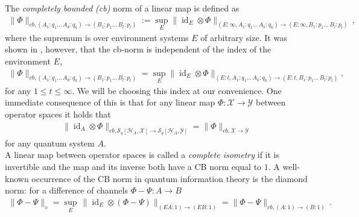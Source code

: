 \documentclass[11pt]{article}
\DeclareMathOperator{\id}{id}
\newcommand{\1}{\ensuremath{\mathbbm{1}}}
\theoremstyle{newdefinition}
\theoremstyle{newplain}
\theoremstyle{myplain}
\begin{document}
The \textit{completely bounded (cb)} norm of a linear map is defined as
\begin{align}
    \|\Phi\|_{cb,(A_1:q_1...\,A_k:q_k)\to (B_1:p_1...\,B_l:p_l)} := \sup_E\|\id_E\otimes\Phi\|_{(E:\infty,A_1:q_1...\,A_k:q_k)\to (E:\infty,B_1:p_1...\,B_l:p_l)}\,,
\end{align}
where the supremum is over environment systems $E$ of arbitrary size. It was shown in \cite[Lemma 1.7]{Book.Pisier.1998}, however, that the cb-norm is independent of the index of the environment $E$, 
\begin{align}
     \|\Phi\|_{cb,(A_1:q_1...\,A_k:q_k)\to (B_1:p_1...\,B_l:p_l)} = \sup_E\|\id_E\otimes\Phi\|_{(E:t,A_1:q_1...\,A_k:q_k)\to (E:t,B_1:p_1...\,B_l:p_l)},
\end{align} for any $1\leq t\leq \infty$. We will be choosing this index at our convenience.
One immediate consequence of this is that for any linear map $\Phi:\mathcal{X}\to \mathcal{Y}$ between operator spaces it holds that
\begin{align}
\|\id_A\otimes\Phi\|_{cb,\mathcal{S}_q[\mathcal{H}_A,\mathcal{X}]\to \mathcal{S}_q[\mathcal{H}_A,\mathcal{Y}]} = \|\Phi\|_{cb,\mathcal{X}\to \mathcal{Y}} 
\end{align} for any quantum system $A$. \\
A linear map between operator spaces is called a \textit{complete isometry} if it is invertible and the map and  its inverse both have a CB norm equal to $1$.
A well-known occurrence of the CB norm in quantum information theory is the diamond norm: for a difference of channels $\Phi-\Psi:A\to B$
\begin{align}
\|\Phi-\Psi\|_\diamond = \sup_E\,\|\id_E\otimes (\Phi-\Psi)\|_{(EA:1)\to (EB:1)} %
= \|\Phi-\Psi\|_{cb,(A:1)\to (B:1)}\,. 
\end{align}

\medskip
\end{document}
